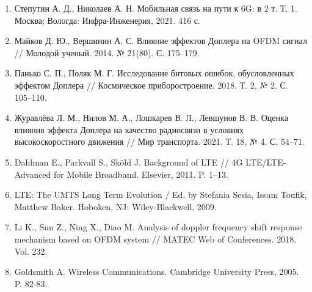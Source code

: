 \begin{enumerate}
    \item \label{steputin20216g_v1} 
    Степутин А. Д., Николаев А. Н. Мобильная связь на пути к 6G: в 2 т. Т. 1. Москва; Вологда: Инфра-Инженерия, 2021. 416 с.

    \item \label{maykov2014vliyanie} 
    Майков Д. Ю., Вершинин А. С. Влияние эффектов Доплера на OFDM сигнал // Молодой ученый. 2014. № 21(80). С. 175–179.

    \item \label{panko2018poliak} 
    Панько С. П., Поляк М. Г. Исследование битовых ошибок, обусловленных эффектом Доплера // Космическое приборостроение. 2018. Т. 2, № 2. С. 105–110.

    \item \label{Zhuravleva2021} 
    Журавлёва Л. М., Нилов М. А., Лошкарев В. Л., Левшунов В. В. Оценка влияния эффекта Доплера на качество радиосвязи в условиях высокоскоростного движения // Мир транспорта. 2021. Т. 18, № 4. С. 54–71.

    \item \label{Dahlman2011} 
    Dahlman E., Parkvall S., Sk\"{o}ld J. Background of LTE // 4G LTE/LTE-Advanced for Mobile Broadband. Elsevier, 2011. P. 1–13.

    \item \label{Sesia2009} 
    LTE: The UMTS Long Term Evolution / Ed. by Stefania Sesia, Issam Toufik, Matthew Baker. Hoboken, NJ: Wiley-Blackwell, 2009.

    \item \label{Li2018} 
    Li K., Sun Z., Ning X., Diao M. Analysis of doppler frequency shift response mechanism based on OFDM system // MATEC Web of Conferences. 2018. Vol. 232.

\item \label{Goldsmith2005} 
    Goldsmith A. Wireless Communications. Cambridge University Press, 2005. P. 82-83.
\end{enumerate}



